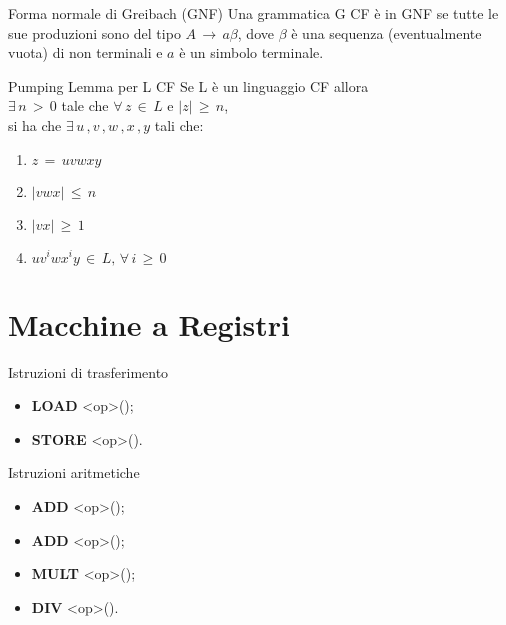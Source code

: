 \documentclass[10pt,a4paper]{article}
\begin{document}
\begin{multicols}{3}
\begin{textbox}{Forma normale di Greibach (GNF)}
Una grammatica G CF è in GNF se tutte le sue produzioni sono del tipo \(A\,\rightarrow\,a\beta\), dove \(\beta\) è una sequenza (eventualmente vuota) di non terminali e \(a\)  è un simbolo terminale.
\end{textbox}

\begin{textbox}{Pumping Lemma per L CF}
Se L è un linguaggio CF allora \\
\(\exists \, n \, > \, 0\) tale che \(\forall \, z \, \in \, L \) e
\(|z| \, \geq \, n\),\\si ha che
\(\exists \, u \, ,v \, ,w \, ,x \, ,y\) tali che:
\begin{enumerate}[leftmargin=*]
    \item \(z\, =\, uvwxy\)
    \item \(|vwx|\, \leq\,  n\)
    \item \(|vx|\, \geq\,  1\)
    \item \(uv^iwx^iy\,\in\,L,\,\forall\,i\,\geq\,0\)
\end{enumerate}
\end{textbox}


\section{Macchine a Registri}

\begin{textbox}{Istruzioni di trasferimento}
\begin{itemize}[leftmargin=*]
    \item \textbf{LOAD} <op>\quad();
    \item \textbf{STORE} <op>\quad().
\end{itemize}
\end{textbox}

\begin{textbox}{Istruzioni aritmetiche}
\begin{itemize}[leftmargin=*]
    \item \textbf{ADD} <op>\quad();
    \item \textbf{ADD} <op>\quad();
    \item \textbf{MULT} <op>\quad();
    \item \textbf{DIV} <op>\quad().
\end{itemize}
\end{textbox}


\end{multicols}
\end{document}
